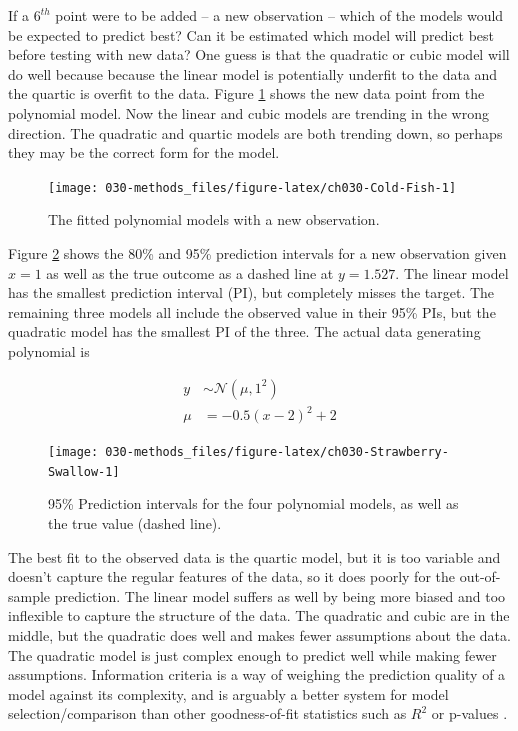 \documentclass[11pt, oneside, openany]{scrbook}
\begin{document}
If a \(6^{th}\) point were to be added -- a new observation -- which of the models would be expected to predict best? Can it be estimated which model will predict best before testing with new data? One guess is that the quadratic or cubic model will do well because because the linear model is potentially underfit to the data and the quartic is overfit to the data. Figure \ref{fig:ch030-Cold-Fish} shows the new data point from the polynomial model. Now the linear and cubic models are trending in the wrong direction. The quadratic and quartic models are both trending down, so perhaps they may be the correct form for the model.

\begin{figure}

{\centering \texttt{[image: 030-methods\_files/figure-latex/ch030-Cold-Fish-1]} 

}

\caption{The fitted polynomial models with a new observation.}\label{fig:ch030-Cold-Fish}
\end{figure}

Figure \ref{fig:ch030-Strawberry-Swallow} shows the 80\% and 95\% prediction intervals for a new observation given \(x = 1\) as well as the true outcome as a dashed line at \(y = 1.527\). The linear model has the smallest prediction interval (PI), but completely misses the target. The remaining three models all include the observed value in their 95\% PIs, but the quadratic model has the smallest PI of the three. The actual data generating polynomial is


\begin{align*}
y &\sim \mathcal{N}(\mu, 1^2) \\
\mu &= -0.5(x - 2)^2 + 2
\end{align*}

\begin{figure}

{\centering \texttt{[image: 030-methods\_files/figure-latex/ch030-Strawberry-Swallow-1]} 

}

\caption{95\% Prediction intervals for the four polynomial models, as well as the true value (dashed line).}\label{fig:ch030-Strawberry-Swallow}
\end{figure}

The best fit to the observed data is the quartic model, but it is too variable and doesn't capture the regular features of the data, so it does poorly for the out-of-sample prediction. The linear model suffers as well by being more biased and too inflexible to capture the structure of the data. The quadratic and cubic are in the middle, but the quadratic does well and makes fewer assumptions about the data. The quadratic model is just complex enough to predict well while making fewer assumptions. Information criteria is a way of weighing the prediction quality of a model against its complexity, and is arguably a better system for model selection/comparison than other goodness-of-fit statistics such as \(R^2\) or p-values \citep{burnham2002practical}.
\end{document}
